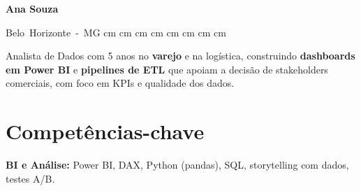 \newcommand{\cvnome}{Ana Souza}
\newcommand{\cvrodape}{Página \thepage{} de \pageref*{LastPage}}


    \begin{header}
        \textbf{\fontsize{24 pt}{24 pt}\selectfont Ana Souza}

        \vspace{0.3 cm}

        \normalsize
        \mbox{{\color{black}\footnotesize\faMapMarker*}\hspace*{0.13cm}Belo Horizonte - MG}%
         cm%
        \AND%
         cm%
        \mbox{}%
         cm%
        \AND%
         cm%
        \mbox{}%
         cm%
        \AND%
         cm%
        \mbox{}%
         cm%
        \AND%
         cm%
        \mbox{}%
    \end{header}

    \vspace{0.3 cm - 0.3 cm}

    \begin{onecolentry}
        Analista de Dados com 5 anos no \textbf{varejo} e na logística, construindo \textbf{dashboards em Power BI} e \textbf{pipelines de ETL} que apoiam a decisão de stakeholders comerciais, com foco em KPIs e qualidade dos dados.
    \end{onecolentry}

    \vspace{0.25 cm}

    \section{Competências-chave}
        \begin{onecolentry}
            \textbf{BI e Análise:} Power BI, DAX, Python (pandas), SQL, storytelling com dados, testes A/B.
        \end{onecolentry}

